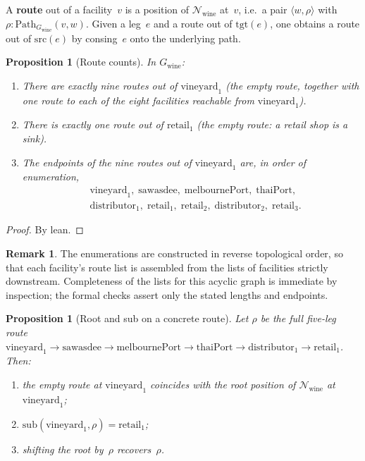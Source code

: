 \documentclass[11pt,a4paper]{article}
\theoremstyle{plain}
\newtheorem{proposition}[theorem]{Proposition}
\theoremstyle{definition}
\newtheorem{remark}[theorem]{Remark}
\newcommand{\src}{\mathrm{src}}
\newcommand{\tgt}{\mathrm{tgt}}
\newcommand{\sub}{\mathrm{sub}}
\begin{document}
A \textbf{route} out of a facility~$v$ is a position of
$\mathcal{N}_{\mathrm{wine}}$ at~$v$, i.e.\ a pair $\langle w,\rho \rangle$
with $\rho : \mathrm{Path}_{G_{\mathrm{wine}}}(v,w)$. Given a leg~$e$ and a
route out of $\tgt(e)$, one obtains a route out of $\src(e)$ by consing~$e$
onto the underlying path.

\begin{proposition}[Route counts]\label{prop:route-counts}
In $G_{\mathrm{wine}}$:
\begin{enumerate}
  \item There are exactly nine routes out of $\mathrm{vineyard}_1$
        (the empty route, together with one route to each of the eight
        facilities reachable from $\mathrm{vineyard}_1$).
  \item There is exactly one route out of $\mathrm{retail}_1$ (the empty
        route: a retail shop is a sink).
  \item The endpoints of the nine routes out of $\mathrm{vineyard}_1$ are,
        in order of enumeration,
        \[
          \begin{aligned}
            &\mathrm{vineyard}_1,\;
            \mathrm{sawasdee},\;
            \mathrm{melbournePort},\;
            \mathrm{thaiPort},\\
            &\mathrm{distributor}_1,\;
            \mathrm{retail}_1,\;
            \mathrm{retail}_2,\;
            \mathrm{distributor}_2,\;
            \mathrm{retail}_3.
          \end{aligned}
        \]
\end{enumerate}
\end{proposition}

\begin{proof}
By lean.
\end{proof}

\begin{remark}
The enumerations are constructed in reverse topological order, so that each
facility's route list is assembled from the lists of facilities strictly
downstream. Completeness of the lists for this acyclic graph is immediate by
inspection; the formal checks assert only the stated lengths and endpoints.
\end{remark}

\begin{proposition}[Root and sub on a concrete route]\label{prop:full-route}
Let $\rho$ be the full five-leg route
$\mathrm{vineyard}_1 \to \mathrm{sawasdee} \to \mathrm{melbournePort} \to
\mathrm{thaiPort} \to \mathrm{distributor}_1 \to \mathrm{retail}_1$. Then:
\begin{enumerate}
  \item the empty route at $\mathrm{vineyard}_1$ coincides with the root
        position of $\mathcal{N}_{\mathrm{wine}}$ at $\mathrm{vineyard}_1$;
  \item $\sub(\mathrm{vineyard}_1,\rho) = \mathrm{retail}_1$;
  \item shifting the root by~$\rho$ recovers~$\rho$.
\end{enumerate}
\end{proposition}
\end{document}
